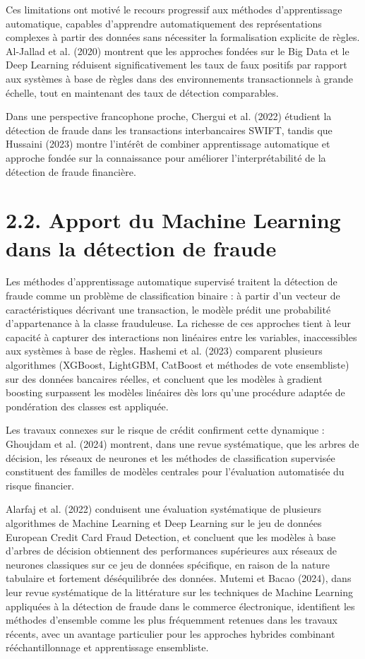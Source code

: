 Ces limitations ont motivé le recours progressif aux méthodes d'apprentissage automatique, capables d'apprendre automatiquement des représentations complexes à partir des données sans nécessiter la formalisation explicite de règles. Al-Jallad et al. (2020) montrent que les approches fondées sur le Big Data et le Deep Learning réduisent significativement les taux de faux positifs par rapport aux systèmes à base de règles dans des environnements transactionnels à grande échelle, tout en maintenant des taux de détection comparables.

Dans une perspective francophone proche, Chergui et al. (2022) étudient la détection de fraude dans les transactions interbancaires SWIFT, tandis que Hussaini (2023) montre l'intérêt de combiner apprentissage automatique et approche fondée sur la connaissance pour améliorer l'interprétabilité de la détection de fraude financière.

\section{2.2. Apport du Machine Learning dans la détection de fraude}

Les méthodes d'apprentissage automatique supervisé traitent la détection de fraude comme un problème de classification binaire : à partir d'un vecteur de caractéristiques décrivant une transaction, le modèle prédit une probabilité d'appartenance à la classe frauduleuse. La richesse de ces approches tient à leur capacité à capturer des interactions non linéaires entre les variables, inaccessibles aux systèmes à base de règles. Hashemi et al. (2023) comparent plusieurs algorithmes (XGBoost, LightGBM, CatBoost et méthodes de vote ensembliste) sur des données bancaires réelles, et concluent que les modèles à gradient boosting surpassent les modèles linéaires dès lors qu'une procédure adaptée de pondération des classes est appliquée.

Les travaux connexes sur le risque de crédit confirment cette dynamique : Ghoujdam et al. (2024) montrent, dans une revue systématique, que les arbres de décision, les réseaux de neurones et les méthodes de classification supervisée constituent des familles de modèles centrales pour l'évaluation automatisée du risque financier.

Alarfaj et al. (2022) conduisent une évaluation systématique de plusieurs algorithmes de Machine Learning et Deep Learning sur le jeu de données European Credit Card Fraud Detection, et concluent que les modèles à base d'arbres de décision obtiennent des performances supérieures aux réseaux de neurones classiques sur ce jeu de données spécifique, en raison de la nature tabulaire et fortement déséquilibrée des données. Mutemi et Bacao (2024), dans leur revue systématique de la littérature sur les techniques de Machine Learning appliquées à la détection de fraude dans le commerce électronique, identifient les méthodes d'ensemble comme les plus fréquemment retenues dans les travaux récents, avec un avantage particulier pour les approches hybrides combinant rééchantillonnage et apprentissage ensembliste.

